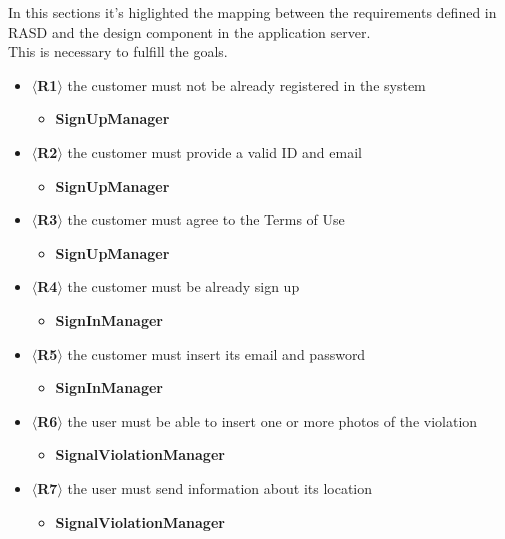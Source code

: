 In this sections it's higlighted the mapping between the requirements defined in
RASD and the design component in the application server.\\ This is necessary to
fulfill the goals.
\begin{itemize}
    \item $\langle$\textbf{R1}$\rangle$ the customer must not be already
    registered  in the system   
    \begin{itemize}
        \item \textbf{SignUpManager}
    \end{itemize}   
    \item $\langle$\textbf{R2}$\rangle$ the customer must provide a valid ID and
    email
    \begin{itemize}
        \item \textbf{SignUpManager}
    \end{itemize}  
    \item $\langle$\textbf{R3}$\rangle$ the customer must agree to the Terms of
    Use
    \begin{itemize}
        \item \textbf{SignUpManager}
    \end{itemize}  
    \item $\langle$\textbf{R4}$\rangle$ the customer must be already sign up
    \begin{itemize}
        \item \textbf{SignInManager}
    \end{itemize}  
    \item $\langle$\textbf{R5}$\rangle$ the customer must insert its email and
    password
    \begin{itemize}
        \item \textbf{SignInManager}
    \end{itemize}  
    \item $\langle$\textbf{R6}$\rangle$ the user must be able to insert one or
    more photos of the violation
    \begin{itemize}
        \item \textbf{SignalViolationManager}
    \end{itemize}  
    \item $\langle$\textbf{R7}$\rangle$ the user must send information about its
    location
    \begin{itemize}
        \item \textbf{SignalViolationManager}

\end{itemize}
\end{itemize}
